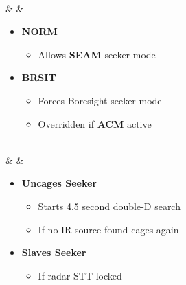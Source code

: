 \documentclass[fontInter]{TechCheck}
\begin{document}
\begin{listlongtable}
\begin{minipage}[t]{\linewidth}
\begin{itemize}
			\end{itemize}
		\end{minipage} \\
		\midrule
		\textbf{\textbullet} &   &
		\begin{minipage}[t]{\linewidth}
			\vspace{-7pt}
			\begin{itemize}
				\item \textbf{NORM}
				\begin{itemize}
					\item Allows \textbf{SEAM} seeker mode
				\end{itemize}
				\item \textbf{BRSIT}
				\begin{itemize}
					\item Forces Boresight seeker mode
					\item Overridden if \textbf{ACM} active
				\end{itemize}
			\end{itemize}
		\end{minipage} \\
		\midrule
		\textbf{\textbullet} &   \hfill\null {} &
		\begin{minipage}[t]{\linewidth}
			\vspace{-7pt}
			\begin{itemize}
				\item \textbf{Uncages Seeker}
				\begin{itemize}
					\item Starts 4.5 second double-D search
					\item If no IR source found cages again
				\end{itemize}
				\item \textbf{Slaves Seeker}
				\begin{itemize}
					\item If radar STT locked
				\end{itemize}
			\end{itemize}
		\end{minipage} \\
	\end{listlongtable}
\end{document}
